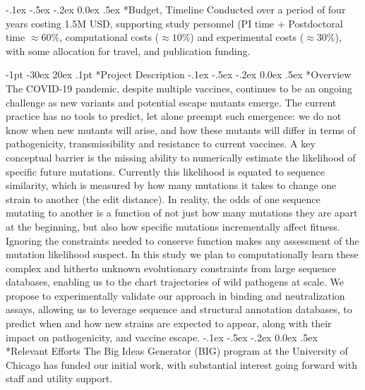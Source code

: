 \documentclass[onecolumn, compsoc,12pt]{IEEEtran}
\makeatletter
\renewcommand\section{\@startsection {section}{1}{\z@}%
                                   {-1pt \@plus -30ex \@minus 20ex}%
                                   {.1pt}%
                                   {\large\bfseries\scshape}}
\renewcommand\paragraph{\@startsection {section}{1}{\z@}%
                                   {-.1ex \@plus -.5ex \@minus -.2ex}%
                                   {0.0ex \@plus.5ex}%
                                   {\fontsize{11}{10}\selectfont\bfseries\itshape\sffamily\color{black}}}
\def\cov{COVID-19\xspace}
\makeatother
\begin{document}
\paragraph*{Budget, Timeline} Conducted  over a period of four years costing  1.5M USD, supporting study personnel (PI time + Postdoctoral time $\approx 60\%$, computational costs ($\approx 10\%$) and experimental costs ($\approx 30\%$), with some allocation for travel, and publication funding. 
  


\clearpage
{}

\setcounter{page}{1}

\section*{Project Description}
\paragraph*{Overview} The \cov pandemic, despite multiple vaccines, continues to be an ongoing challenge as new variants and potential escape mutants emerge. The current practice has no tools to predict, let alone preempt such emergence: we do not know when  new mutants  will arise, and how these mutants will differ in terms of pathogenicity, transmissibility and resistance to current vaccines.  A key conceptual barrier  is the missing ability to numerically estimate the likelihood of specific future mutations. Currently this likelihood is  equated to sequence similarity, which is measured by how many mutations it takes to change one strain to another (the edit distance). In reality, the odds of one sequence mutating to another is a function of not just how many mutations they are apart at the beginning, but also how specific mutations incrementally affect fitness. Ignoring the constraints needed to conserve function makes any assessment of the mutation likelihood suspect. In this study we plan to computationally learn these complex and hitherto unknown evolutionary constraints from large sequence databases, enabling us to the chart   trajectories of wild pathogens at scale. We propose to experimentally validate our approach  in binding and neutralization assays,  allowing us to leverage  sequence and structural  annotation databases, to predict when and how new strains are expected to appear, along with their  impact on pathogenicity, and vaccine escape. 
\paragraph*{Relevant Efforts}  The  Big Ideas Generator (BIG) program at the University of Chicago  has funded our initial work, with  substantial interest going forward with staff and utility support.
\end{document}
